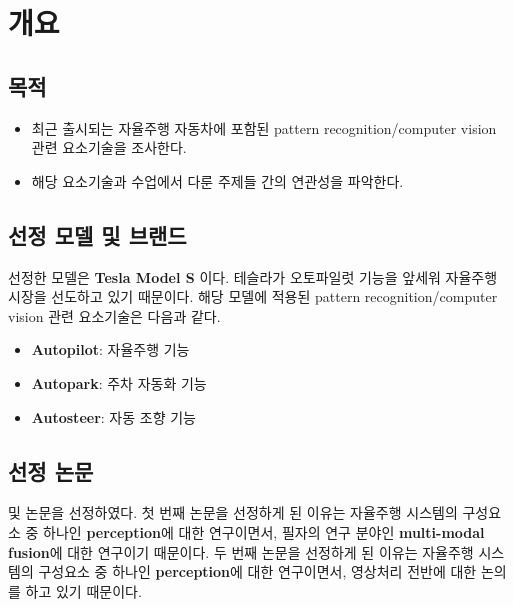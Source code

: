 \section{개요}{\label{sec:intro}}

\subsection{목적}
\begin{itemize}\tightlist
    \item 최근 출시되는 자율주행 자동차에 포함된 pattern recognition/computer vision 관련 요소기술을 조사한다.
    \item 해당 요소기술과 수업에서 다룬 주제들 간의 연관성을 파악한다.
\end{itemize}

\subsection{선정 모델 및 브랜드}
선정한 모델은 \textbf{Tesla Model S} 이다.
테슬라가 오토파일럿 기능을 앞세워 자율주행 시장을 선도하고 있기 때문이다.
해당 모델에 적용된 pattern recognition/computer vision 관련 요소기술은 다음과 같다.
\begin{itemize}\tightlist
    \item \textbf{Autopilot}: 자율주행 기능
    \item \textbf{Autopark}: 주차 자동화 기능
    \item \textbf{Autosteer}: 자동 조향 기능
\end{itemize}

\subsection{선정 논문}
\cite[Multi-modal fusion transformer for end-to-end autonomous driving]{Transfuser} 및 
\cite[YOLOv7: Trainable bag-of-freebies sets new state-of-the-art for real-time object detectors]{YOLOv7}
논문을 선정하였다.
첫 번째 논문을 선정하게 된 이유는 자율주행 시스템의 구성요소 중 하나인 \textbf{perception}에 대한 연구이면서,
필자의 연구 분야인 \textbf{multi-modal fusion}에 대한 연구이기 때문이다.
두 번째 논문을 선정하게 된 이유는 자율주행 시스템의 구성요소 중 하나인 \textbf{perception}에 대한 연구이면서,
영상처리 전반에 대한 논의를 하고 있기 때문이다.

